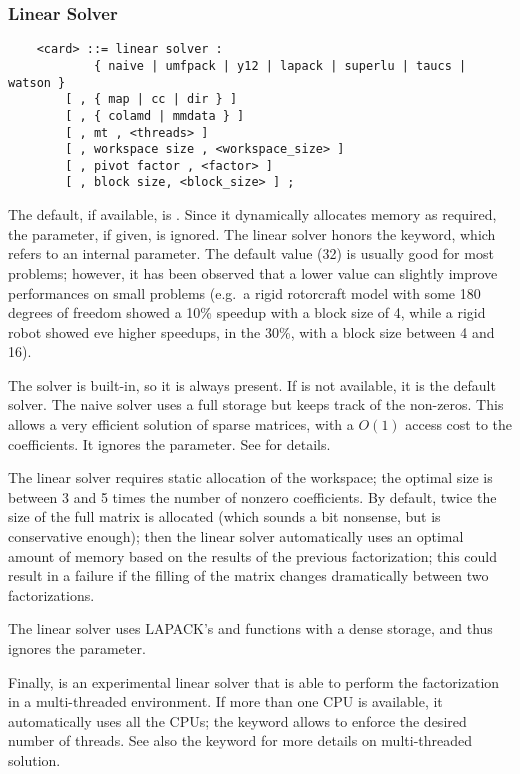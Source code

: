 \subsubsection{Linear Solver}   
\label{sec:LINEAR-SOLVER}
\begin{verbatim}
    <card> ::= linear solver :
            { naive | umfpack | y12 | lapack | superlu | taucs | watson }
        [ , { map | cc | dir } ]
        [ , { colamd | mmdata } ]
        [ , mt , <threads> ]
        [ , workspace size , <workspace_size> ] 
        [ , pivot factor , <factor> ]
        [ , block size, <block_size> ] ;
\end{verbatim}
The default, if available, is .
Since it dynamically allocates memory as required, the  
parameter, if given, is ignored.
The  linear solver honors the  keyword,
which refers to an internal parameter.
The default value (32) is usually good for most problems; however,
it has been observed that a lower value can slightly improve
performances on small problems (e.g.\ a rigid rotorcraft model
with some 180 degrees of freedom showed a 10\% speedup with 
a block size of 4, while a rigid robot showed eve higher speedups,
in the 30\%, with a block size between 4 and 16).

The  solver is built-in, so it is always present.
If  is not available, it is the default solver.
The naive solver uses a full storage but keeps track of the non-zeros.
This allows a very efficient solution of sparse matrices, with
a $O(1)$ access cost to the coefficients.
It ignores the  parameter.
See \cite{NAIVE-2007} for details.

The  linear solver requires static allocation of the workspace;
the optimal size is between 3 and 5 times the number of nonzero 
coefficients.
By default, twice the size of the full matrix is allocated
(which sounds a bit nonsense, but is conservative enough);
then the linear solver automatically uses an optimal amount of memory
based on the results of the previous factorization; this could
result in a failure if the filling of the matrix changes 
dramatically between two factorizations.

The  linear solver uses LAPACK's  and 
functions with a dense storage, and thus ignores the 
parameter.

Finally,  is an experimental linear solver that is able to perform
the factorization in a multi-threaded environment.
If more than one CPU is available, it automatically uses all the CPUs;
the keyword  allows to enforce the desired number of threads.
See also the  keyword for more details on multi-threaded
solution.

